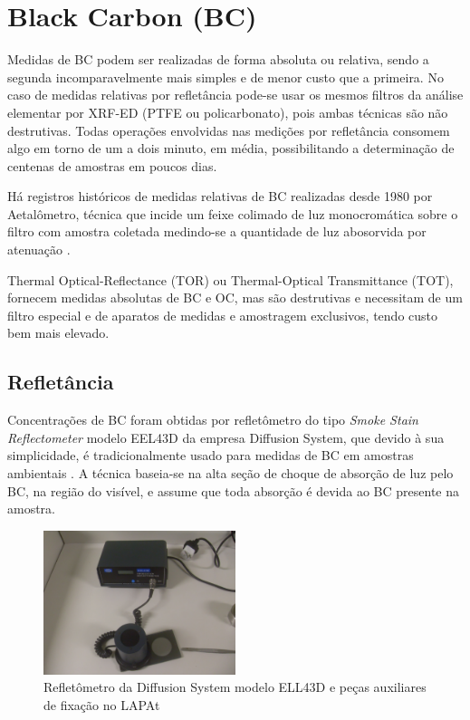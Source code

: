 \section{Black Carbon (BC)}

Medidas de BC podem ser realizadas de forma absoluta ou relativa, sendo a 
segunda incomparavelmente mais simples e de menor custo que a primeira. 
No caso de medidas relativas por refletância pode-se usar os mesmos filtros 
da análise elementar por XRF-ED (PTFE ou policarbonato), pois ambas técnicas são 
não destrutivas. Todas operações envolvidas nas medições por refletância 
consomem algo em torno de um a dois minuto, em média, possibilitando a 
determinação de centenas de amostras em poucos dias.

Há registros históricos de medidas relativas de BC realizadas desde 
1980 por Aetalômetro, técnica que incide um feixe colimado de luz monocromática
sobre o filtro com amostra coletada medindo-se a quantidade de luz abosorvida
por atenuação \citep{targino2016}. 

Thermal Optical-Reflectance (TOR) ou Thermal-Optical Transmittance (TOT), 
fornecem medidas absolutas de BC e OC, mas são destrutivas e necessitam de um 
filtro especial e de aparatos de medidas e amostragem exclusivos, 
tendo custo bem mais elevado.

\subsection{Refletância}

Concentrações de BC foram obtidas por refletômetro do tipo 
\textit{Smoke Stain Reflectometer} modelo EEL43D da empresa Diffusion System, 
que devido à sua simplicidade, é tradicionalmente usado para medidas de BC em 
amostras ambientais \citep{lack2014}. A técnica baseia-se na alta seção 
de choque de absorção de luz pelo BC, na região do visível, e assume que 
toda absorção é devida ao BC presente na amostra.

\begin{figure}[H]
  \centering
  \includegraphics[width=0.5\textwidth]{../inputs/images/refletometro.jpg}
  \caption{Refletômetro da Diffusion System modelo ELL43D 
           e peças auxiliares de fixação no LAPAt}
\end{figure}

